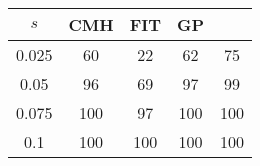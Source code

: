 \centering \begin{tabular}{c|c|c|c|c}
$s$	&CMH	&FIT	&GP	&\sc{Clear} \\\hline
0.025	&60	&22	&62	&75\\
0.05	&96	&69	&97	&99\\
0.075	&100	&97	&100	&100\\
0.1	&100	&100	&100	&100\\
\end{tabular}
